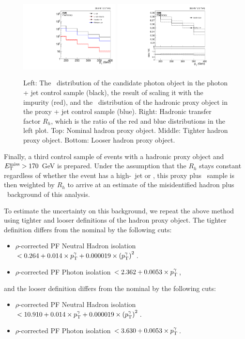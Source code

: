 \begin{figure}[htbp]
\begin{center}
    \includegraphics[width=0.45\textwidth]{Analysis/Figures/hfake/distributionsLoose.pdf}
    \includegraphics[width=0.45\textwidth]{Analysis/Figures/hfake/tfactorLoose.pdf}
    \caption{
      Left: The \pt\ distribution of the candidate photon object in the photon + jet control sample (black), the result of scaling it with the impurity (red), and the \pt\ distribution of the hadronic proxy object in the proxy + jet control sample (blue).
      Right: Hadronic transfer factor $R_{h}$, which is the ratio of the red and blue distributions in the left plot. 
      Top: Nominal hadron proxy object. 
      Middle: Tighter hadron proxy object. 
      Bottom: Looser hadron proxy object.
    }
    \label{fig:hadronTFactor}
  \end{center}
\end{figure}

Finally, a third control sample of events with a hadronic proxy object and $E_{\mathrm{T}}^{\text{miss}} > 170$ GeV is prepared. 
Under the assumption that the $R_{h}$ stays constant regardless of whether the event has a high-\pt\ jet or \met, this proxy plus \met\ sample is then weighted by $R_{h}$ to arrive at an estimate of the misidentified hadron plus \met\ background of this analysis.

To estimate the uncertainty on this background, we repeat the above method using tighter and looser definitions of the hadron proxy object.
The tighter definition differs from the nominal by the following cuts:
\begin{itemize}
\item $\rho$-corrected PF Neutral Hadron isolation $< 0.264 + 0.014 \times p_{\mathrm{T}}^\gamma + 0.000019 \times \left( p_{\mathrm{T}}^\gamma \right)^2$. 
\item $\rho$-corrected PF Photon isolation $< 2.362 + 0.0053 \times p_{\mathrm{T}}^\gamma$,
\end{itemize}
and the looser definition differs from the nominal by the following cuts:
\begin{itemize}
\item $\rho$-corrected PF Neutral Hadron isolation $< 10.910 + 0.014 \times p_{\mathrm{T}}^\gamma + 0.000019 \times \left( p_{\mathrm{T}}^\gamma \right)^2$. 
\item $\rho$-corrected PF Photon isolation $< 3.630 + 0.0053 \times p_{\mathrm{T}}^\gamma$.
\end{itemize}


